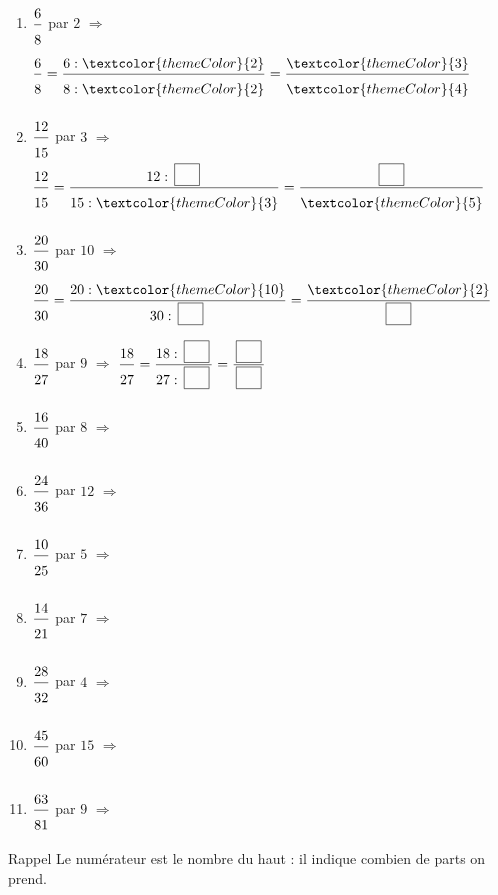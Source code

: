  
\begin{enumerate}[leftmargin=*,align=parleft, label=\alph*), itemsep=9pt]
\item $\FA{6}{8}$ par $2$ \quad $\Longrightarrow$ \quad $\FA{6}{8}=\FA{6 : \textcolor{themeColor}{2}}{8 : \textcolor{themeColor}{2}}=\FA{\textcolor{themeColor}{3}}{\textcolor{themeColor}{4}}$
\item $\FA{12}{15}$ par $3$ \quad $\Longrightarrow$ \quad $\FA{12}{15}=\FA{12 : \CaseC}{15 : \textcolor{themeColor}{3}}=\FA{\CaseC}{\textcolor{themeColor}{5}}$
\item $\FA{20}{30}$ par $10$ \quad $\Longrightarrow$ \quad $\FA{20}{30}=\FA{20 : \textcolor{themeColor}{10}}{30 : \CaseC}=\FA{\textcolor{themeColor}{2}}{\CaseC}$
\item $\FA{18}{27}$ par $9$ \quad $\Longrightarrow$ \quad $\FA{18}{27}=\FA{18 : \CaseC}{27 : \CaseC}=\FA{\CaseC}{\CaseC}$
\item $\FA{16}{40}$ par $8$ \quad $\Longrightarrow$
\item $\FA{24}{36}$ par $12$ \quad $\Longrightarrow$
\item $\FA{10}{25}$ par $5$ \quad $\Longrightarrow$
\item $\FA{14}{21}$ par $7$ \quad $\Longrightarrow$
\item $\FA{28}{32}$ par $4$ \quad $\Longrightarrow$
\item $\FA{45}{60}$ par $15$ \quad $\Longrightarrow$
\item $\FA{63}{81}$ par $9$ \quad $\Longrightarrow$
\end{enumerate}
 
\newpage
{}

\begin{astuce}{Rappel}
Le \textcolor{themeColor}{numérateur} est le nombre du haut : il indique combien de parts on prend.
\end{astuce}
  
